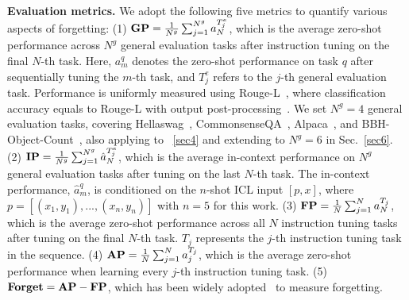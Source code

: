 \textbf{Evaluation metrics.} 
We adopt the following five metrics to quantify various aspects of forgetting:
(1) $\text{\textbf{GP}} = \frac{1}{N^g}\sum_{j=1}^{N^g} a^{T^e_j}_{N}$, which is the average zero-shot performance across $N^g$ general evaluation tasks after instruction tuning on the final $N$-th task. Here, $a^{q}_{m}$ denotes the zero-shot performance on task $q$ after sequentially tuning the $m$-th task, and $T^e_j$ refers to the $j$-th general evaluation task. Performance is uniformly measured using Rouge-L~\citep{lin2004rouge}, where classification accuracy equals to Rouge-L with output post-processing~\citep{zhao2024sapt}. We set $N^g=4$ general evaluation tasks, covering Hellaswag~\citep{zellers2019hellaswag}, CommonsenseQA~\citep{talmor2018commonsenseqa}, Alpaca~\citep{hendrycks2020measuring}, and BBH-Object-Count~\citep{srivastava2022beyond}, also applying to ~\ref{sec4} and extending to $N^g=6$ in Sec.~\ref{sec6}.
(2) $\text{\textbf{IP}} =\frac{1}{N^g}\sum_{j=1}^{N^g} \hat{a}^{T^e_j}_{N}$, which is the average in-context performance on $N^g$ general evaluation tasks after tuning on the last $N$-th task. The in-context performance, $\hat{a}^{q}_{m}$, is conditioned on the $n$-shot ICL input $[p,x]$, where $p=[(x_1, y_1), ..., (x_n, y_n)]$ with $n=5$ for this work.
(3) $\text{\textbf{FP}} = \frac{1}{N}\sum_{j=1}^{N} a^{T_j}_{N}$, which is the average zero-shot performance across all $N$ instruction tuning tasks after tuning on the final $N$-th task. $T_j$ represents the $j$-th instruction tuning task in the sequence.
(4) $\text{\textbf{AP}}=\frac{1}{N}\sum_{j=1}^N a_j^{T_j}$, which is the average zero-shot performance when learning every $j$-th instruction tuning task.
(5) $\text{\textbf{Forget}}=\text{\textbf{AP}}-\text{\textbf{FP}}$, which has been widely adopted~\cite{wu2022pretrained, ke2023continual} to measure forgetting.
